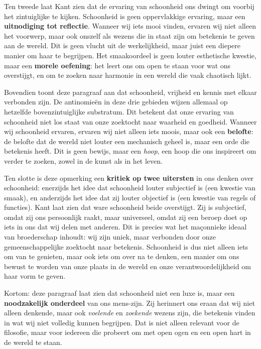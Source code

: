 \begin{mdframed}[leftmargin=0pt,rightmargin=0pt,backgroundcolor=blue!6,linecolor=white,innertopmargin=6pt,innerbottommargin=6pt]
Ten tweede laat Kant zien dat de ervaring van schoonheid ons dwingt om voorbij het zintuiglijke te kijken. Schoonheid is geen oppervlakkige ervaring, maar een \textbf{uitnodiging tot reflectie}. Wanneer wij iets mooi vinden, ervaren wij niet alleen het voorwerp, maar ook onszelf als wezens die in staat zijn om betekenis te geven aan de wereld. Dit is geen vlucht uit de werkelijkheid, maar juist een diepere manier om haar te begrijpen. Het smaakoordeel is geen louter esthetische kwestie, maar een \textbf{morele oefening}: het leert ons om open te staan voor wat ons overstijgt, en om te zoeken naar harmonie in een wereld die vaak chaotisch lijkt.

Bovendien toont deze paragraaf aan dat schoonheid, vrijheid en kennis met elkaar verbonden zijn. De antinomieën in deze drie gebieden wijzen allemaal op hetzelfde bovenzintuiglijke substratum. Dit betekent dat onze ervaring van schoonheid niet los staat van onze zoektocht naar waarheid en goedheid. Wanneer wij schoonheid ervaren, ervaren wij niet alleen iets moois, maar ook een \textbf{belofte}: de belofte dat de wereld niet louter een mechanisch geheel is, maar een orde die betekenis heeft. Dit is geen bewijs, maar een \textit{hoop}, een hoop die ons inspireert om verder te zoeken, zowel in de kunst als in het leven.

Ten slotte is deze opmerking een \textbf{kritiek op twee uitersten} in ons denken over schoonheid: enerzijds het idee dat schoonheid louter subjectief is (een kwestie van smaak), en anderzijds het idee dat zij louter objectief is (een kwestie van regels of functies). Kant laat zien dat ware schoonheid beide overstijgt. Zij is subjectief, omdat zij ons persoonlijk raakt, maar universeel, omdat zij een beroep doet op iets in ons dat wij delen met anderen. Dit is precies wat het maçonnieke ideaal van broederschap inhoudt: wij zijn uniek, maar verbonden door onze gemeenschappelijke zoektocht naar betekenis. Schoonheid is dus niet alleen iets om van te genieten, maar ook iets om over na te denken, een manier om ons bewust te worden van onze plaats in de wereld en onze verantwoordelijkheid om haar vorm te geven.

Kortom: deze paragraaf laat zien dat schoonheid niet een luxe is, maar een \textbf{noodzakelijk onderdeel} van ons mens-zijn. Zij herinnert ons eraan dat wij niet alleen denkende, maar ook \textit{voelende} en \textit{zoekende} wezens zijn, die betekenis vinden in wat wij niet volledig kunnen begrijpen. Dat is niet alleen relevant voor de filosofie, maar voor iedereen die probeert om met open ogen en een open hart in de wereld te staan.
\end{mdframed}

